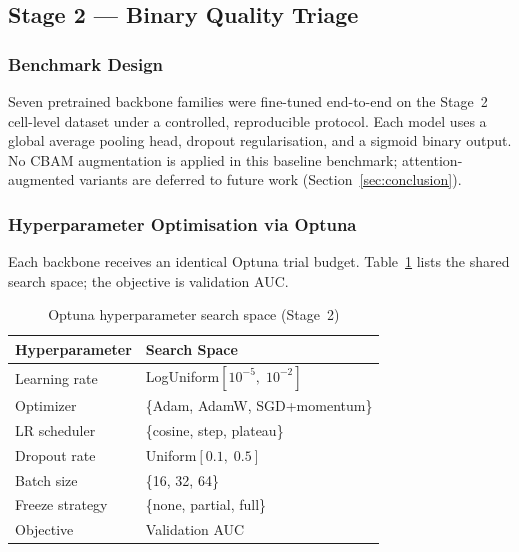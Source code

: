 \documentclass[conference]{IEEEtran}
\begin{document}
\subsection{Stage 2 --- Binary Quality Triage}
\label{sec:stage2}

\subsubsection{Benchmark Design}

Seven pretrained backbone families were fine-tuned end-to-end
on the Stage~2 cell-level dataset under a controlled,
reproducible protocol. Each model uses a global average
pooling head, dropout regularisation, and a sigmoid binary
output. No CBAM augmentation is applied in this baseline
benchmark; attention-augmented variants are deferred to
future work (Section~\ref{sec:conclusion}).

\subsubsection{Hyperparameter Optimisation via Optuna}

Each backbone receives an identical Optuna trial budget.
Table~\ref{tab:optuna_space} lists the shared search space;
the objective is validation AUC.

\begin{table}[t]
  \caption{Optuna hyperparameter search space (Stage~2)}
  \label{tab:optuna_space}
  \begin{center}
  \renewcommand{\arraystretch}{1.05}
  \small
  \begin{tabular}{p{2.3cm}p{4.9cm}}
    \toprule
    \textbf{Hyperparameter} & \textbf{Search Space} \\
    \midrule
    Learning rate & LogUniform$[10^{-5},\;10^{-2}]$ \\
    Optimizer & \{Adam, AdamW, SGD+momentum\} \\
    LR scheduler & \{cosine, step, plateau\} \\
    Dropout rate & Uniform$[0.1,\;0.5]$ \\
    Batch size & \{16, 32, 64\} \\
    Freeze strategy & \{none, partial, full\} \\
    Objective & Validation AUC \\
    \bottomrule
  \end{tabular}
  \end{center}
\end{table}
\end{document}
